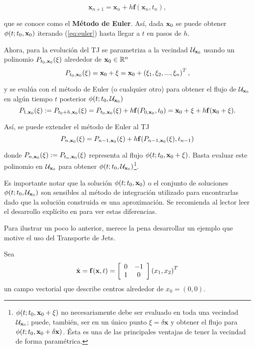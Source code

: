 \begin{equation}
 \mathbf{x}_{n+1} = \mathbf{x}_n + h \mathbf{f}(\mathbf{x}_n,t_n),
 \label{eq:euler} 
\end{equation}

que se conoce como el \textbf{Método de Euler}. Así, dada $\mathbf{x}_0$ se puede obtener $\phi(t;t_0,\mathbf{x}_0)$ iterando (\ref{eq:euler}) hasta llegar a $t$ en pasos de $h$.

Ahora, para la evolución del TJ se parametriza a la vecindad $\mathcal{U}_{\mathbf{x}_0}$ usando un polinomio $P_{t_0,\mathbf{x}_0}(\xi)$ alrededor de $\mathbf{x}_0 \in \mathbb{R}^n$ 
\begin{equation*}
 P_{t_0,\mathbf{x}_0}(\xi) = \mathbf{x}_0 + \xi = \mathbf{x}_0 + \left( \xi_1, \xi_2, ..., \xi_n \right)^T,
\end{equation*} 

y se evalúa con el método de Euler (o cualquier otro) para obtener el flujo de $\mathcal{U}_{\mathbf{x}_0}$ en algún tiempo $t$ posterior $\phi(t;t_0,\mathcal{U}_{\mathbf{x}_0} )$
\begin{equation*}
P_{1,\mathbf{x}_0}(\xi) := P_{t_0+h,\mathbf{x}_0}(\xi) = P_{t_0,\mathbf{x}_0}(\xi) + h \mathbf{f}(P_{0,\mathbf{x}_0},t_0) = \mathbf{x}_0 + \xi + h \mathbf{f}(\mathbf{x}_0 + \xi).
\end{equation*}

Así, se puede extender el método de Euler al TJ 
\begin{equation}
 P_{n,\mathbf{x}_0}(\xi) = P_{n-1,\mathbf{x}_0}(\xi) + h \mathbf{f}(P_{n-1,\mathbf{x}_0}(\xi),t_{n-1})
 \label{eq:eulerU}
\end{equation}

donde $P_{n,\mathbf{x}_0}(\xi) := P_{t_n,\mathbf{x}_0}(\xi)$ representa al flujo $\phi(t;t_0,\mathbf{x}_0 + \xi)$. Basta evaluar este polinomio en $\mathcal{U}_{\mathbf{x}_0}$ para obtener $\phi(t;t_0,\mathcal{U}_{\mathbf{x}_0} )$\footnote{$\phi(t;t_0,\mathbf{x}_0 + \xi)$ no necesariamente debe ser evaluado en toda una vecindad $\mathcal{U}_{\mathbf{x}_0}$; puede, también, ser en un único punto $\xi =\delta \mathbf{x}$ y obtener el flujo para $\phi(t;t_0,\mathbf{x}_0 + \delta \mathbf{x})$. Ésta es una de las principales ventajas de tener la vecindad de forma paramétrica.}.

Es importante notar que la solución $\phi(t;t_0,\mathbf{x}_0)$ o el conjunto de soluciones $\phi(t;t_0,\mathcal{U}_{\mathbf{x}_0} )$ son sensibles al método de integración utilizado para encontrarlas dado que la solución construida es una aproximación. Se recomienda al lector leer el desarrollo explícito en \cite{Perez2015} para ver estas diferencias.

Para ilustrar un poco lo anterior, merece la pena desarrollar un ejemplo que motive el uso del Transporte de Jets.

Sea
\begin{align}
\dot{\mathbf{x}} = \mathbf{f}(\mathbf{x},t) = \left[ \begin{array}{cc}
 0 & -1  \\
 1 & 0  \\
\end{array} \right] \left( x_1, x_2 \right)^T
\label{eq:center}
\end{align}
un campo vectorial que describe centros alrededor de $x_0 = (0,0)$. 

